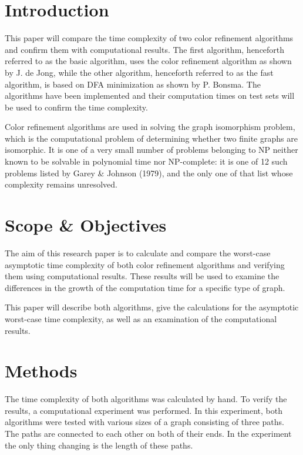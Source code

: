 \documentclass[twoside]{article}
\begin{document}
\begin{multicols}{2} %



\section{Introduction}
\label{intro}
This paper will compare the time complexity of two color refinement algorithms and confirm them with computational results. The first algorithm, henceforth referred to as the basic algorithm, uses the color refinement algorithm as shown by J. de Jong\cite{presentation:slidesPartI}, while the other algorithm, henceforth referred to as the fast algorithm, is based on DFA minimization as shown by P. Bonsma\cite{presentation:slidesPartIII}. The algorithms have been implemented and their computation times on test sets will be used to confirm the time complexity.

Color refinement algorithms are used in solving the graph isomorphism problem, which is the computational problem of determining whether two finite graphs are isomorphic. It is one of a very small number of problems belonging to NP neither known to be solvable in polynomial time nor NP-complete: it is one of 12 such problems listed by Garey \& Johnson (1979)\cite{book:gareyJohnson1979}, and the only one of that list whose complexity remains unresolved.\cite{website:wikiGI}

\section{Scope \& Objectives}
\label{scope}
The aim of this research paper is to calculate and compare the worst-case asymptotic time complexity of both color refinement algorithms and verifying them using computational results. These results will be used to examine the differences in the growth of the computation time for a specific type of graph.

This paper will describe both algorithms, give the calculations for the asymptotic worst-case time complexity, as well as an examination of the computational results.
\section{Methods}
\label{methods}
The time complexity of both algorithms was calculated by hand. To verify the results, a computational experiment was performed. In this experiment, both algorithms were tested with various sizes of a graph consisting of three paths. The paths are connected to each other on both of their ends. In the experiment the only thing changing is the length of these paths.


\end{multicols}
\end{document}
